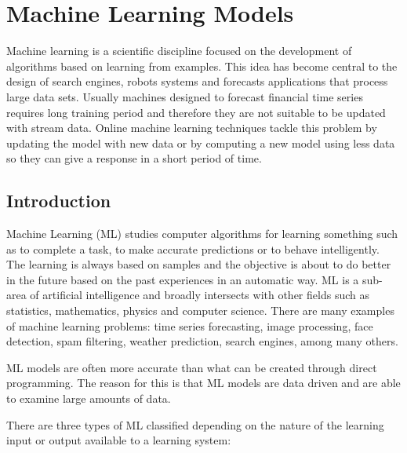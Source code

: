 \chapter{Machine Learning Models}
Machine learning is a scientific discipline focused on the development of
algorithms based on learning from examples. This idea has become central to the
design of search engines, robots systems and forecasts applications that process
large data sets. Usually machines designed to forecast financial time series
requires long training period and therefore they are not suitable to be updated
with stream data. Online machine learning techniques tackle this problem by
updating the model with new data or by computing a new model using less data so
they can give a response in a short period of time.

\vspace{0.5cm} 

\section{Introduction}
Machine Learning (ML) studies computer algorithms for learning something such as
to complete a task, to make accurate predictions or to behave intelligently. The
learning is always based on samples and the objective is about to do better in
the future based on the past experiences in an automatic way. ML is a sub-area
of artificial intelligence and broadly intersects with other fields such as
statistics, mathematics, physics and computer science.  There are many examples
of machine learning problems: time series forecasting, image processing, face
detection, spam filtering, weather prediction, search engines, among many
others.

ML models are often more accurate than what can be created through direct
programming. The reason for this is that ML models are data driven and are able
to examine large amounts of data.

There are three types of ML classified depending on the nature of the learning
input or output available to a learning system:

